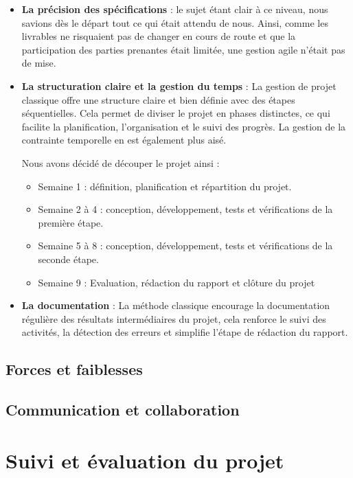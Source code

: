 \documentclass[a4paper, 12pt]{report}
\begin{document}
\begin{itemize}
    \item \textbf{La précision des spécifications} : le sujet étant clair à ce niveau, nous savions dès le départ tout ce qui était attendu de nous. Ainsi, comme les livrables ne risquaient pas de changer en cours de route et que la participation des parties prenantes était limitée, une gestion agile n'était pas de mise.
    \bigskip
    
    \item \textbf{La structuration claire et la gestion du temps} : La gestion de projet classique offre une structure claire et bien définie avec des étapes séquentielles. Cela permet de diviser le projet en phases distinctes, ce qui facilite la planification, l'organisation et le suivi des progrès. La gestion de la contrainte temporelle en est également plus aisé.
    \bigskip
    
    Nous avons décidé de découper le projet ainsi :
    \begin{itemize}
        \item Semaine 1 : définition, planification et répartition du projet.
        \item Semaine 2 à 4 : conception, développement, tests et vérifications de la première étape.
        \item Semaine 5 à 8 : conception, développement, tests et vérifications de la seconde étape.
        \item Semaine 9 : Evaluation, rédaction du rapport et clôture du projet
    \end{itemize}
    \bigskip

    \item \textbf{La documentation} : La méthode classique encourage la documentation régulière des résultats intermédiaires du projet, cela renforce le suivi des activités, la détection des erreurs et simplifie l'étape de rédaction du rapport.
\end{itemize}

        \subsection{Forces et faiblesses}
        
        \subsection{Communication et collaboration}

\clearpage
    \section{Suivi et évaluation du projet}
\end{document}
